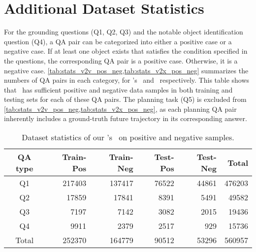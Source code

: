 
\section{Additional Dataset Statistics}

For the grounding questions (Q1, Q2, Q3) and the notable object identification question (Q4), a QA pair can be categorized into either a positive case or a negative case. If at least one object exists that satisfies the condition specified in the questions, the corresponding QA pair is a positive case. Otherwise, it is a negative case. \cref{tab:stats_v2v_pos_neg,tab:stats_v2x_pos_neg} summarizes the numbers of QA pairs in each category, for \namedataset's \namevsplit~and \namexsplit~respectively. This table shows that \namedataset~has sufficient positive and negative data samples in both training and testing sets for each of these QA pairs. The planning task (Q5) is excluded from \cref{tab:stats_v2v_pos_neg,tab:stats_v2x_pos_neg}, as each planning QA pair inherently includes a ground-truth future trajectory in its corresponding answer.




\begin{table}[!t]
\small
\setlength{\tabcolsep}{3.5pt}
\begin{center}
\begin{tabular}{c | rr | rr | r}
  \hline
  \hline
  QA type & Train-Pos & Train-Neg & Test-Pos & Test-Neg & Total \\
  \hline
  \hline
  Q1 & 217403 & 137417 & 76522 & 44861 & 476203 \\
  Q2 &  17859 &  17841 &  8391 &  5491 &  49582 \\
  Q3 &   7197 &   7142 &  3082 &  2015 &  19436 \\
  Q4 &   9911 &   2379 &  2517 &   929 &  15736 \\
  \hline
  Total & 252370 & 164779 & 90512 & 53296 & 560957 
\end{tabular}
\vspace{-10pt}
\caption{
Dataset statistics of our \namedataset's \namevsplit~on positive and negative samples. 
}
\label{tab:stats_v2v_pos_neg}
\end{center}
\vspace{-10pt}
\end{table}


